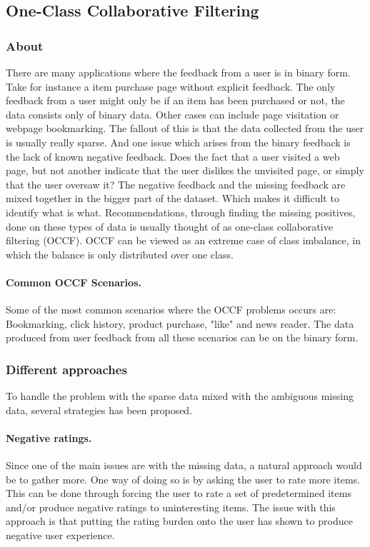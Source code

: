 \subsection{One-Class Collaborative Filtering}
\subsubsection{About}
There are many applications where the feedback from a user is in binary form.
Take for instance a item purchase page without explicit feedback.
The only feedback from a user might only be if an item has been purchased or not, the data consists only of binary data.
Other cases can include page visitation or webpage bookmarking.
The fallout of this is that the data collected from the user is usually really sparse.
And one issue which arises from the binary feedback is the lack of known negative feedback.
Does the fact that a user visited a web page, but not another indicate that the user dislikes the unvisited page, or simply that the user oversaw it?
The negative feedback and the missing feedback are mixed together in the bigger part of the dataset.
Which makes it difficult to identify what is what.
Recommendations, through finding the missing positives, done on these types of data is usually thought of as one-class collaborative filtering (OCCF).
OCCF can be viewed as an extreme case of class imbalance, in which the balance is only distributed over one class. %

\paragraph{Common OCCF Scenarios.}
Some of the most common scenarios where the OCCF problems occurs are:
Bookmarking, click history, product purchase, "like" and news reader.
The data produced from user feedback from all these scenarios can be on the binary form.

\subsubsection{Different approaches}
To handle the problem with the sparse data mixed with the ambiguous missing data, several strategies has been proposed.

\paragraph{Negative ratings.}
Since one of the main issues are with the missing data, a natural approach would be to gather more.
One way of doing so is by asking the user to rate more items.
This can be done through forcing the user to rate a set of predetermined items and/or produce negative ratings to uninteresting items.
The issue with this approach is that putting the rating burden onto the user has shown to produce negative user experience. %

